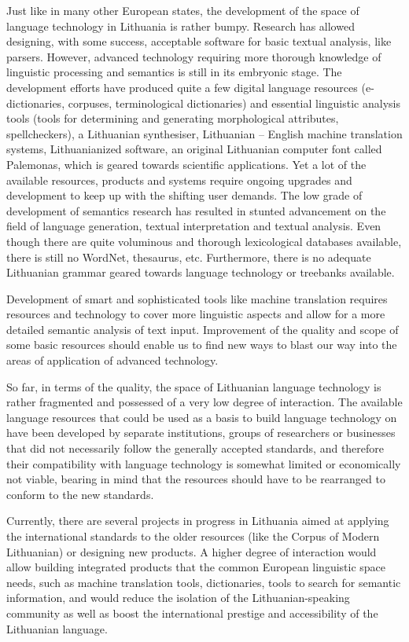 \begin{multicols}{2}
Just like in many other European states, the development of the space of language technology in Lithuania is rather bumpy. Research has allowed designing, with some success, acceptable software for basic textual analysis, like parsers. However, advanced technology requiring more thorough knowledge of linguistic processing and semantics is still in its embryonic stage. The development efforts have produced quite a few digital language resources (e-dictionaries, corpuses, terminological dictionaries) and essential linguistic analysis tools (tools for determining and generating morphological attributes, spellcheckers), a Lithuanian synthesiser, Lithuanian – English machine translation systems, Lithuanianized software, an original Lithuanian computer font called Palemonas, which is geared towards scientific applications. Yet a lot of the available resources, products and systems require ongoing upgrades and development to keep up with the shifting user demands. The low grade of development of semantics research has resulted in stunted advancement on the field of language generation, textual interpretation and textual analysis. Even though there are quite voluminous and thorough lexicological databases available, there is still no WordNet, thesaurus, etc. Furthermore, there is no adequate Lithuanian grammar geared towards language technology or treebanks available.

Development of smart and sophisticated tools like machine translation requires resources and technology to cover more linguistic aspects and allow for a more detailed semantic analysis of text input. Improvement of the quality and scope of some basic resources should enable us to find new ways to blast our way into the areas of application of advanced technology.

So far, in terms of the quality, the space of Lithuanian language technology is rather fragmented and possessed of a very low degree of interaction. The available language resources that could be used as a basis to build language technology on have been developed by separate institutions, groups of researchers or businesses that did not necessarily follow the generally accepted standards, and therefore their compatibility with language technology is somewhat limited or economically not viable, bearing in mind that the resources should have to be rearranged to conform to the new standards.

Currently, there are several projects in progress in Lithuania aimed at applying the international standards to the older resources (like the Corpus of Modern Lithuanian) or designing new products. A higher degree of interaction would allow building integrated products that the common European linguistic space needs, such as machine translation tools, dictionaries, tools to search for semantic information, and would reduce the isolation of the Lithuanian-speaking community as well as boost the international prestige and accessibility of the Lithuanian language.


\end{multicols}
